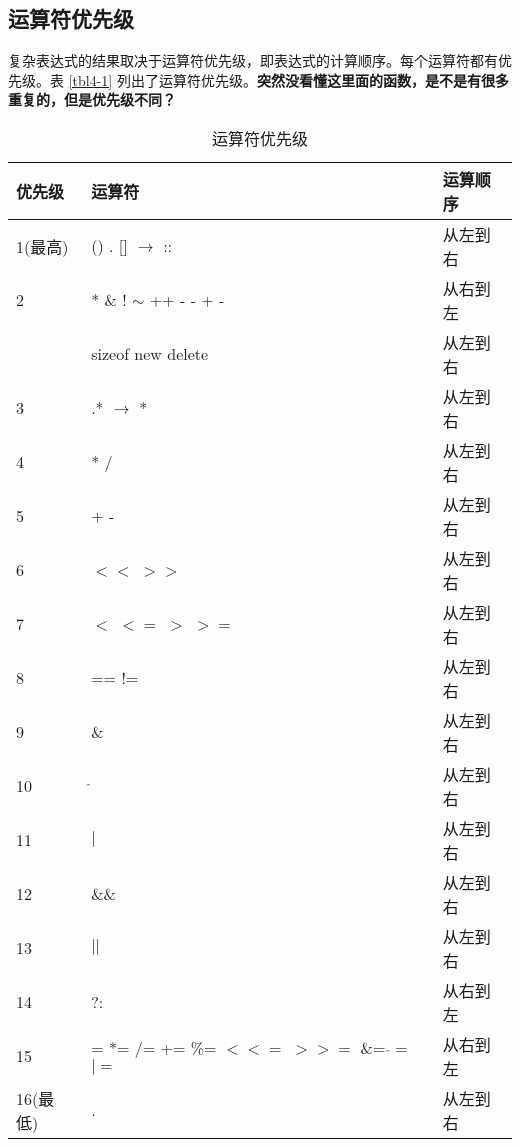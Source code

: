 \subsection*{运算符优先级}
复杂表达式的结果取决于运算符优先级，即表达式的计算顺序。每个运算符都有优先级。表 \autoref{tbl4-1} 列出了运算符优先级。\textbf{突然没看懂这里面的函数，是不是有很多重复的，但是优先级不同？}
\begin{table}
    \centering
    \caption{运算符优先级}
    \label{tbl4-1}
    \begin{tabular}{lll}
        \hline
        优先级    & 运算符                                           & 运算顺序 \\
        \hline
        1(最高)  & () . [] $\rightarrow$ ::                      & 从左到右 \\
        2      & * \& ! $\sim$ ++ - - + -                      & 从右到左 \\
               & sizeof new delete                             & 从左到右 \\
        3      & .* $\rightarrow$ *                            & 从左到右 \\
        4      & * /                                           & 从左到右 \\
        5      & + -                                           & 从左到右 \\
        6      & $<<$ $>>$                                     & 从左到右 \\
        7      & $<$ $<=$ $>$ $>=$                             & 从左到右 \\
        8      & == !=                                         & 从左到右 \\
        9      & \&                                            & 从左到右 \\
        10     & $\hat{}$                                      & 从左到右 \\
        11     & $|$                                           & 从左到右 \\
        12     & \&\&                                          & 从左到右 \\
        13     & $||$                                          & 从左到右 \\
        14     & ?:                                            & 从右到左 \\
        15     & = *= /= += \%= $<<=$ $>>=$ \&= $\hat{}=$ $|=$ & 从右到左 \\
        16(最低) & .                                             & 从左到右 \\
        \hline
    \end{tabular}
\end{table}

